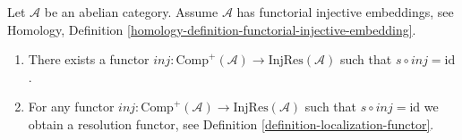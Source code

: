 \begin{lemma}
\label{lemma-functorial-injective-resolutions}
Let $\mathcal{A}$ be an abelian category.
Assume $\mathcal{A}$ has functorial injective embeddings, see
Homology, Definition \ref{homology-definition-functorial-injective-embedding}.
\begin{enumerate}
\item There exists a functor
$inj : \text{Comp}^{+}(\mathcal{A}) \to \text{InjRes}(\mathcal{A})$
such that $s \circ inj = \text{id}$.
\item For any functor
$inj : \text{Comp}^{+}(\mathcal{A}) \to \text{InjRes}(\mathcal{A})$
such that $s \circ inj = \text{id}$ we obtain a resolution functor, see
Definition \ref{definition-localization-functor}.
\end{enumerate}
\end{lemma}

